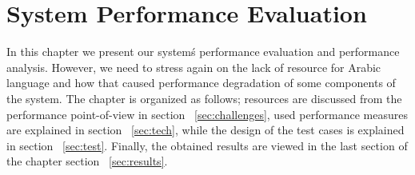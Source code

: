 
\chapter{System Performance Evaluation} %

\label{eval} %

In this chapter we present our system\'s performance evaluation and performance analysis. However, we need to stress again on the lack of resource for Arabic language and how that caused performance degradation of some components of the system. The chapter is organized as follows; resources are discussed from the performance point-of-view in section ~\ref{sec:challenges}, used performance measures are explained in section ~\ref{sec:tech}, while the design of the test cases is explained in section ~\ref{sec:test}. Finally, the obtained results are viewed in the last section of the chapter section ~\ref{sec:results}.

